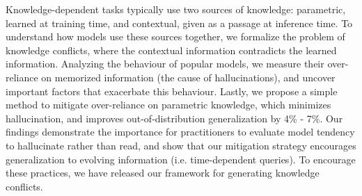 Knowledge-dependent tasks typically use two sources of knowledge: parametric, learned at training time, and contextual, given as a passage at inference time. To understand how models use these sources together, we formalize the problem of knowledge conflicts, where the contextual information contradicts the learned information. Analyzing the behaviour of popular models, we measure their over-reliance on memorized information (the cause of hallucinations), and uncover important factors that exacerbate this behaviour. Lastly, we propose a simple method to mitigate over-reliance on parametric knowledge, which minimizes hallucination, and improves out-of-distribution generalization by 4\% - 7\%. Our findings demonstrate the importance for practitioners to evaluate model tendency to hallucinate rather than read, and show that our mitigation strategy encourages generalization to evolving information (i.e. time-dependent queries). To encourage these practices, we have released our framework for generating knowledge conflicts.
